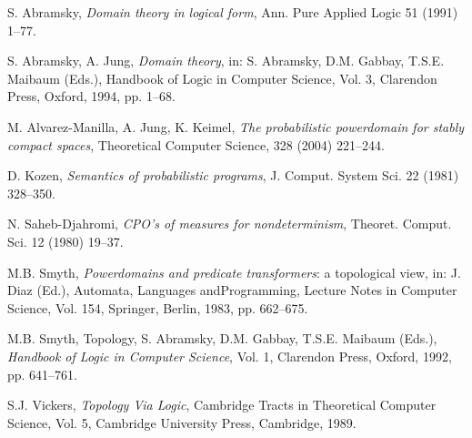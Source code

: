 \documentclass[12pt,a4paper]{article}
\theoremstyle{definition}
\theoremstyle{theorem}
\theoremstyle{definition}
\begin{document}
\normalsize
\small
\setLTRbibitems
\begin{thebibliography}{99}
\resetlatinfont

S. Abramsky, {\em Domain theory in logical form}, Ann. Pure Applied Logic 51 (1991) 1–77.

S. Abramsky, A. Jung, {\em Domain theory}, in: S. Abramsky, D.M. Gabbay, T.S.E. Maibaum (Eds.), Handbook of
Logic in Computer Science, Vol. 3, Clarendon Press, Oxford, 1994, pp. 1–68.

M. Alvarez-Manilla, A. Jung, K. Keimel, {\em The probabilistic powerdomain for stably compact spaces}, Theoretical Computer Science, 328 (2004) 221–244.

D. Kozen, {\em Semantics of probabilistic programs}, J. Comput. System Sci. 22 (1981) 328–350.

N. Saheb-Djahromi, {\em CPO’s of measures for nondeterminism}, Theoret. Comput. Sci. 12 (1980) 19–37.

M.B. Smyth, {\em Powerdomains and predicate transformers}: a topological view, in: J. Diaz (Ed.), Automata,
Languages andProgramming, Lecture Notes in Computer Science, Vol. 154, Springer, Berlin, 1983,
pp. 662–675.

M.B. Smyth, Topology, S. Abramsky, D.M. Gabbay, T.S.E. Maibaum (Eds.), {\em Handbook of Logic in
Computer Science}, Vol. 1, Clarendon Press, Oxford, 1992, pp. 641–761.

S.J. Vickers, {\em Topology Via Logic}, Cambridge Tracts in Theoretical Computer Science, Vol. 5, Cambridge
University Press, Cambridge, 1989.

\end{thebibliography}
\end{document}
